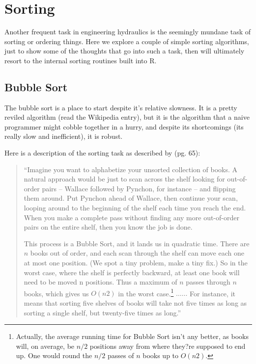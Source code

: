 \section{Sorting}
Another frequent task in engineering hydraulics is the seemingly mundane task of sorting or ordering things. 
Here we explore a couple of simple sorting algorithms, just to show some of the thoughts that go into such a task, then will ultimately resort to the internal sorting routines built into R.
\subsection{Bubble Sort}
The bubble sort is a place to start despite it's relative slowness.
It is a pretty reviled algorithm (read the Wikipedia entry), but it is the algorithm that a naive programmer might cobble together in a hurry, and despite its shortcomings (its really slow and inefficient), it is robust.

Here is a description of the sorting task as described by \cite{Christian2016} (pg. 65):
\begin{quote}
``Imagine you want to alphabetize your unsorted collection of books. A natural approach would be just to scan across the shelf looking for out-of-order pairs -- Wallace followed by Pynchon, for instance -- and flipping them around. Put Pynchon ahead of Wallace, then continue your scan, looping around to the beginning of the shelf each time you reach the end. When you make a complete pass without finding any more out-of-order pairs on the entire shelf, then you know the job is done.

This process is a Bubble Sort, and it lands us in quadratic time. There are $n$ books out of order, and each scan through the shelf can move each one at most one position. (We spot a tiny problem, make a tiny fix.) So in the worst case, where the shelf is perfectly backward, at least one book will need to be moved n positions. Thus a maximum of $n$ passes through $n$ books, which gives us $O(n2)$ in the worst case.\footnote{Actually, the average running time for Bubble Sort isn't any better, as books will, on average, be $n/2$ positions away from where they?re supposed to end up. One would round the $n/2$ passes of $n$ books up to $O(n2)$.}
$\dots \dots$  For instance, it means that sorting five shelves of books will take not five times as long as sorting a single shelf, but twenty-five times as long.''
\end{quote}

